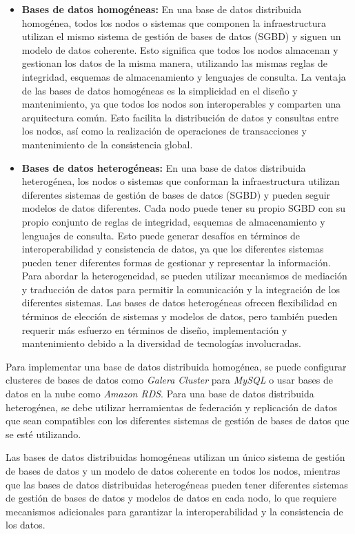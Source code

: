 \begin{itemize}
	\item \textbf{Bases de datos homogéneas:} En una base de datos distribuida homogénea, todos los nodos o sistemas que componen la infraestructura utilizan el mismo sistema de gestión de bases de datos (SGBD) y siguen un modelo de datos coherente. Esto significa que todos los nodos almacenan y gestionan los datos de la misma manera, utilizando las mismas reglas de integridad, esquemas de almacenamiento y lenguajes de consulta. La ventaja de las bases de datos homogéneas es la simplicidad en el diseño y mantenimiento, ya que todos los nodos son interoperables y comparten una arquitectura común. Esto facilita la distribución de datos y consultas entre los nodos, así como la realización de operaciones de transacciones y mantenimiento de la consistencia global.
	\item \textbf{Bases de datos heterogéneas:} En una base de datos distribuida heterogénea, los nodos o sistemas que conforman la infraestructura utilizan diferentes sistemas de gestión de bases de datos (SGBD) y pueden seguir modelos de datos diferentes. Cada nodo puede tener su propio SGBD con su propio conjunto de reglas de integridad, esquemas de almacenamiento y lenguajes de consulta. Esto puede generar desafíos en términos de interoperabilidad y consistencia de datos, ya que los diferentes sistemas pueden tener diferentes formas de gestionar y representar la información. Para abordar la heterogeneidad, se pueden utilizar mecanismos de mediación y traducción de datos para permitir la comunicación y la integración de los diferentes sistemas. Las bases de datos heterogéneas ofrecen flexibilidad en términos de elección de sistemas y modelos de datos, pero también pueden requerir más esfuerzo en términos de diseño, implementación y mantenimiento debido a la diversidad de tecnologías involucradas.
\end{itemize}
Para implementar una base de datos distribuida homogénea, se puede configurar clusteres de bases de datos como \textit{Galera Cluster} para \textit{MySQL} o usar bases de datos en la nube como \textit{Amazon RDS}. Para una base de datos distribuida heterogénea, se debe utilizar herramientas de federación y replicación de datos que sean compatibles con los diferentes sistemas de gestión de bases de datos que se esté utilizando.

\begin{tcolorbox}[colback=yellow!10!white, colframe=blue!50!black, title=Resumiendo, coltitle=white]
	Las bases de datos distribuidas homogéneas utilizan un único sistema de gestión de bases de datos y un modelo de datos coherente en todos los nodos, mientras que las bases de datos distribuidas heterogéneas pueden tener diferentes sistemas de gestión de bases de datos y modelos de datos en cada nodo, lo que requiere mecanismos adicionales para garantizar la interoperabilidad y la consistencia de los datos.
\end{tcolorbox}

